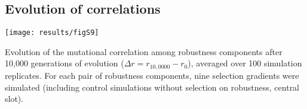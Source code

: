 \documentclass[10pt,a4paper]{article}
\begin{document}
\begin{appendices}
    \subsection*{Evolution of correlations}
    
	\begin{center}
	\texttt{[image: results/figS9]} 
	\end{center}
	
	{\color{Gray} Evolution of the mutational correlation among robustness components after 10,000 generations of evolution ($\Delta r = r_{10,0000} - r_0$), averaged over 100 simulation replicates. For each pair of robustness components, nine selection gradients were simulated (including control simulations without selection on robustness, central slot). }
	
\end{appendices}
\end{document}

